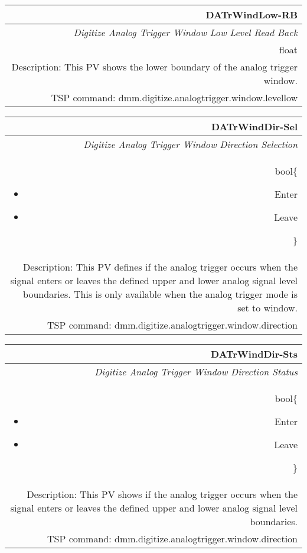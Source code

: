 \documentclass[openany]{article}
\begin{document}
		\begin{tabular}{N}
			\hline
			\bfseries DATrWindLow-RB\label{pv:datrwindlow-rb} \\ \hline
			\emph{Digitize Analog Trigger Window Low Level Read Back} \\
			float \\
			Description: This PV shows the lower boundary of the analog trigger window. \\
			TSP command: dmm.digitize.analogtrigger.window.levellow
		\end{tabular}

		\begin{tabular}{N}
			\hline
			\bfseries DATrWindDir-Sel\label{pv:datrwinddir-sel} \\ \hline
			\emph{Digitize Analog Trigger Window Direction Selection} \\
			bool\{\begin{itemize}[noitemsep]
				\small
				\item[] Enter
				\item[] Leave
			\end{itemize}\} \\
			Description: This PV defines if the analog trigger occurs when the signal enters or leaves the defined upper and lower analog signal level boundaries. This is only available when the analog trigger mode is set to window. \\
			TSP command: dmm.digitize.analogtrigger.window.direction
		\end{tabular}

		\begin{tabular}{N}
			\hline
			\bfseries DATrWindDir-Sts\label{pv:datrwinddir-sts} \\ \hline
			\emph{Digitize Analog Trigger Window Direction Status} \\
			bool\{\begin{itemize}[noitemsep]
				\small
				\item[] Enter
				\item[] Leave
			\end{itemize}\} \\
			Description: This PV shows if the analog trigger occurs when the signal enters or leaves the defined upper and lower analog signal level boundaries. \\
			TSP command: dmm.digitize.analogtrigger.window.direction
		\end{tabular}
\end{document}
